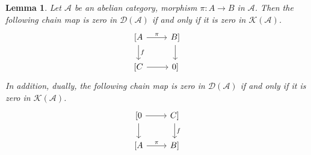\documentclass{ctexart}
\newtheorem{lemma}{Lemma}[section]
\begin{document}
\begin{lemma}
    Let $\mathscr{A}$ be an abelian category, morphism $\pi: A \rightarrow B$ in $\mathscr{A}$.
    Then the following chain map is zero in $\mathcal{D}(\mathscr{A})$ if and only if it is zero in $\mathcal{K}(\mathscr{A})$.
    \begin{equation}
        \begin{tikzcd}
            {[A} \arrow[r, "\pi"] \arrow[d, "f"] &
            {B]} \arrow[d] \\
            {[C} \arrow[r] &
            {0]}
        \end{tikzcd}
        \label{equation:chain_map_in_lemma_6.6}
    \end{equation}
    In addition, dually, the following chain map is zero in $\mathcal{D}(\mathscr{A})$ if and only if it is zero in $\mathcal{K}(\mathscr{A})$.
    \begin{equation}
        \begin{tikzcd}
            {[0} \arrow[r] \arrow[d] &
            {C]} \arrow[d, "f"] \\
            {[A} \arrow[r, "\pi"] &
            {B]}
        \end{tikzcd}
    \end{equation}
    \label{Lemma 6.6}
\end{lemma}
\vspace{-\baselineskip} %
\end{document}
